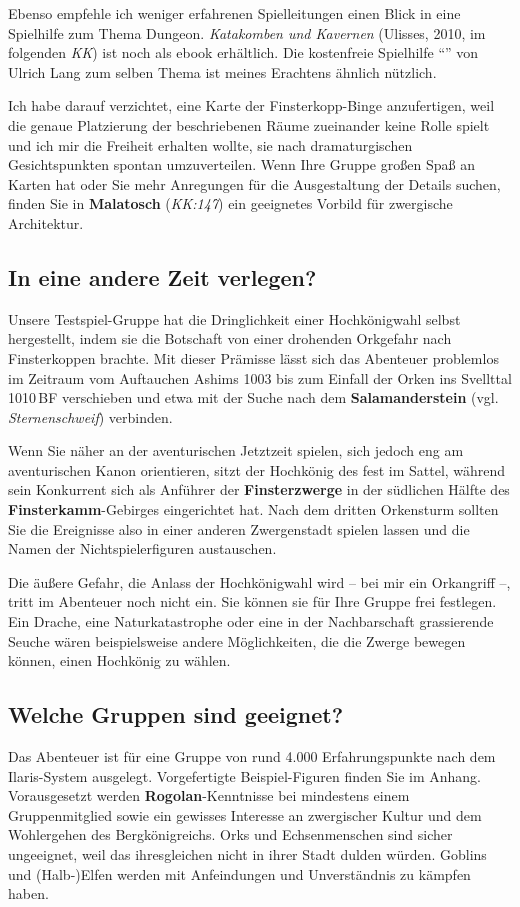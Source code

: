 Ebenso empfehle ich weniger erfahrenen Spielleitungen einen Blick in eine Spielhilfe zum Thema Dungeon.
\emph{Katakomben und Kavernen} (Ulisses, 2010, im folgenden \emph{KK})
ist noch als ebook erhältlich.
Die kostenfreie Spielhilfe \enquote{} von Ulrich Lang
zum selben Thema ist meines Erachtens ähnlich nützlich.

Ich habe darauf verzichtet, eine Karte der Finsterkopp-Binge anzufertigen, weil die genaue Platzierung der beschriebenen Räume zueinander keine Rolle spielt und ich mir die Freiheit erhalten wollte, sie nach dramaturgischen Gesichtspunkten spontan umzuverteilen. Wenn Ihre Gruppe großen Spaß an Karten hat oder Sie mehr Anregungen für die Ausgestaltung der Details suchen,
finden Sie in \textbf{Malatosch} (\emph{KK:147}) ein geeignetes Vorbild für zwergische Architektur.

\subsection*{In eine andere Zeit verlegen?}
Unsere Testspiel-Gruppe hat die Dringlichkeit einer Hochkönigwahl selbst hergestellt, indem sie die Botschaft von einer drohenden Orkgefahr nach Finsterkoppen brachte.
Mit dieser Prämisse lässt sich das Abenteuer problemlos im Zeitraum vom Auftauchen Ashims 1003 bis zum Einfall der Orken ins Svellttal 1010\,BF verschieben
und etwa mit der Suche nach dem  \textbf{Salamanderstein} (vgl. \emph{Sternenschweif}) verbinden.

Wenn Sie näher an der aventurischen Jetztzeit spielen, sich jedoch eng am aventurischen Kanon orientieren, sitzt der Hochkönig des \fkvs fest im Sattel,
während sein Konkurrent sich als Anführer der \textbf{Finsterzwerge} in der südlichen Hälfte des \textbf{Finsterkamm}-Gebirges eingerichtet hat.
Nach dem dritten Orkensturm sollten Sie die Ereignisse also in einer anderen Zwergenstadt spielen lassen und die Namen der Nichtspielerfiguren austauschen.

Die äußere Gefahr, die Anlass der Hochkönigwahl wird -- bei mir ein Orkangriff --, tritt im Abenteuer noch nicht ein. Sie können sie für Ihre Gruppe frei festlegen.
Ein Drache, eine Naturkatastrophe oder eine in der Nachbarschaft grassierende Seuche wären beispielsweise andere Möglichkeiten, die die Zwerge bewegen können, einen Hochkönig zu wählen.

\subsection*{Welche Gruppen sind geeignet?}
Das Abenteuer ist für eine Gruppe von rund 4.000 Erfahrungspunkte nach dem Ilaris-System ausgelegt. Vorgefertigte Beispiel-Figuren finden Sie im Anhang.
Vorausgesetzt werden \textbf{Rogolan}-Kenntnisse bei mindestens einem Gruppenmitglied sowie ein gewisses Interesse an zwergischer Kultur und dem Wohlergehen des Bergkönigreichs.
Orks und Echsenmenschen sind sicher ungeeignet, weil das \fkv ihresgleichen nicht in ihrer Stadt dulden würden.
Goblins und (Halb-)Elfen werden mit Anfeindungen und Unverständnis zu kämpfen haben.

